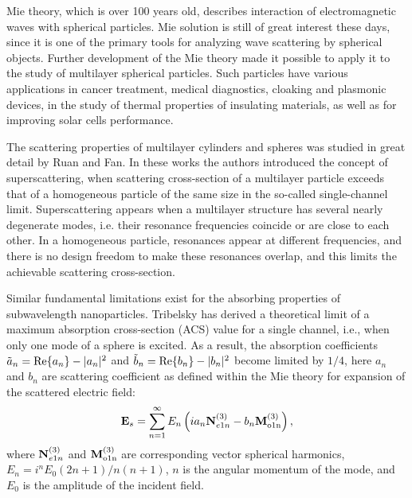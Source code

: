 \documentclass[twoside,twocolumn,9pt]{article}
\begin{document}

\rmfamily %


Mie theory,\cite{Mie-1908} which is over 100 years old, describes
interaction of electromagnetic waves with spherical particles. Mie
solution is still of great interest these
days,\cite{Suzuki-2008,MacKowski-2012,Lerme-2000,Xu-2005,Li-2006,Gogoi-2010,Santiago-2011}
since it is one of the primary tools for analyzing wave scattering by
spherical objects. Further development of the Mie
theory\cite{Yang-2003, Pena-scattnlay-2009} made it possible to apply
it to the study of multilayer spherical
particles.\cite{Sheehan-2013,Selmke-2012}  Such particles have
various applications in cancer treatment,\cite{Zhang-2010,
  Hirsch-2003} medical diagnostics,\cite{Allain-2002}
cloaking\cite{Qui-2009, Semouchkina-2013, Ladutenko-2014} and
plasmonic devices,\cite{Liu-MatLett-2015, Martin-2013, Alu-2005, Liu-Nanotech-2013} in the study of
thermal properties of insulating materials,\cite{Xie-2013} as well as
for improving solar cells performance.\cite{Kameya-2011,Mann-2011}

The scattering properties of multilayer cylinders and spheres was
studied in great detail by Ruan and Fan.\cite{Fan-2010,Fan-2011}  In
these works the authors introduced the concept of superscattering,
when scattering cross-section of a multilayer particle exceeds that of
a homogeneous particle of the same size in the so-called
single-channel limit. Superscattering appears when a multilayer
structure has several nearly degenerate modes, i.e. their resonance
frequencies coincide or are close to each other. In a homogeneous
particle, resonances appear at different frequencies, and there is no
design freedom to make these resonances overlap, and this limits the
achievable scattering cross-section.

Similar fundamental limitations exist for the absorbing properties of
subwavelength nanoparticles.  Tribelsky\cite{Tribelsky-2011} has
derived a theoretical limit of a maximum absorption cross-section
(ACS) value for a single channel, i.e., when only one mode of a sphere
is excited.  As a result, the absorption coefficients $\tilde{a}_n=
{\rm Re}\{a_n\} - |a_n|^2 $ and $\tilde{b}_n= {\rm Re}\{b_n\} -
|b_n|^2 $ become limited by $1/4$, here $a_n$ and $b_n$ are scattering
coefficient as defined within the Mie theory\cite{Bohren-1983} for
expansion of the scattered electric field:
\[
{\rm \mathbf{E}}_s = \sum_{n=1}^{\infty} E_n \left( i a_n {\rm
    \mathbf{N}}_{e1n}^{(3)} - b_n{\rm\mathbf{M}_{o1n}^{(3)}} \right),
\]
where ${\rm \mathbf{N}}_{e1n}^{(3)}$ and ${\rm\mathbf{M}_{o1n}^{(3)}}$
are corresponding vector spherical harmonics,
$E_n=i^nE_0(2n+1)/n(n+1)$, $n$ is the angular momentum of the mode,
and $E_0$ is the amplitude of the incident field.
\end{document}
